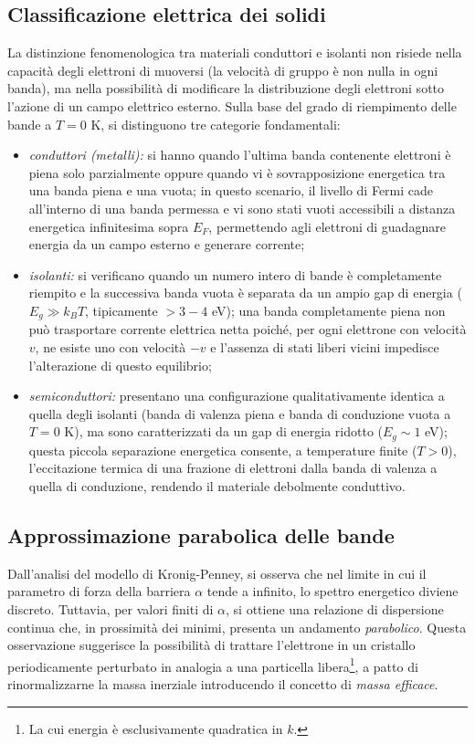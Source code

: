 \documentclass[a4paper,11pt]{report}
\begin{document}
\subsection{Classificazione elettrica dei solidi}
La distinzione fenomenologica tra materiali conduttori e isolanti non risiede nella capacità degli elettroni di muoversi (la velocità di gruppo è non nulla in ogni banda), ma nella possibilità di modificare la distribuzione degli elettroni sotto l'azione di un campo elettrico esterno.
Sulla base del grado di riempimento delle bande a $T=0$ K, si distinguono tre categorie fondamentali:

\begin{itemize}
    \item \textit{conduttori (metalli):} si hanno quando l'ultima banda contenente elettroni è piena solo parzialmente oppure quando vi è sovrapposizione energetica tra una banda piena e una vuota; in questo scenario, il livello di Fermi cade all'interno di una banda permessa e vi sono stati vuoti accessibili a distanza energetica infinitesima sopra $E_F$, permettendo agli elettroni di guadagnare energia da un campo esterno e generare corrente;
    
    \item \textit{isolanti:} si verificano quando un numero intero di bande è completamente riempito e la successiva banda vuota è separata da un ampio gap di energia ($E_g \gg k_B T$, tipicamente $> 3-4$ eV); una banda completamente piena non può trasportare corrente elettrica netta poiché, per ogni elettrone con velocità $v$, ne esiste uno con velocità $-v$ e l'assenza di stati liberi vicini impedisce l'alterazione di questo equilibrio;
    
    \item \textit{semiconduttori:} presentano una configurazione qualitativamente identica a quella degli isolanti (banda di valenza piena e banda di conduzione vuota a $T=0$ K), ma sono caratterizzati da un gap di energia ridotto ($E_g \sim 1$ eV); questa piccola separazione energetica consente, a temperature finite ($T > 0$), l'eccitazione termica di una frazione di elettroni dalla banda di valenza a quella di conduzione, rendendo il materiale debolmente conduttivo.
\end{itemize}


\subsection{Approssimazione parabolica delle bande}
Dall'analisi del modello di Kronig-Penney, si osserva che nel limite in cui il parametro di forza della barriera $\alpha$ tende a infinito, lo spettro energetico diviene discreto. Tuttavia, per valori finiti di $\alpha$, si ottiene una relazione di dispersione continua che, in prossimità dei minimi, presenta un andamento \textit{parabolico}.
Questa osservazione suggerisce la possibilità di trattare l'elettrone in un cristallo periodicamente perturbato in analogia a una particella libera\footnote{La cui energia è esclusivamente quadratica in $k$.}, a patto di rinormalizzarne la massa inerziale introducendo il concetto di \textit{massa efficace}.
\end{document}
